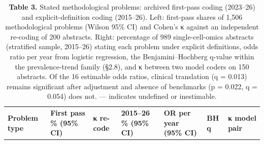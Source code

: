 \documentclass{article}
\begin{document}
\begin{longtable}[l]{@{}
  >{\raggedright\arraybackslash}p{}
  >{\raggedright\arraybackslash}p{}
  >{\raggedright\arraybackslash}p{}
  >{\raggedright\arraybackslash}p{}
  >{\raggedright\arraybackslash}p{}
  >{\raggedright\arraybackslash}p{}
  >{\raggedright\arraybackslash}p{}@{}}
\caption{\textbf{Table 3.} Stated methodological problems: archived first-pass
coding (2023--26) and explicit-definition coding (2015--26). Left:
first-pass shares of 1,506 methodological problems (Wilson 95\% CI) and
Cohen's κ against an independent re-coding of 200 abstracts. Right:
percentage of 989 single-cell-omics abstracts (stratified sample,
2015--26) stating each problem under explicit definitions, odds ratio
per year from logistic regression, the Benjamini--Hochberg q-value
within the prevalence-trend family (§2.8), and κ between two model
coders on 150 abstracts. Of the 16 estimable odds ratios, clinical
translation (q = 0.013) remains significant after adjustment and absence
of benchmarks (p = 0.022, q = 0.054) does not. --- indicates undefined
or inestimable.}\tabularnewline
\toprule
\begin{minipage}[b]{\linewidth}\raggedright
\textbf{Problem type}
\end{minipage} & \begin{minipage}[b]{\linewidth}\raggedright
\textbf{First pass \% (95\% CI)}
\end{minipage} & \begin{minipage}[b]{\linewidth}\raggedright
\textbf{κ re-code}
\end{minipage} & \begin{minipage}[b]{\linewidth}\raggedright
\textbf{2015--26 \% (95\% CI)}
\end{minipage} & \begin{minipage}[b]{\linewidth}\raggedright
\textbf{OR per year (95\% CI)}
\end{minipage} & \begin{minipage}[b]{\linewidth}\raggedright
\textbf{BH q}
\end{minipage} & \begin{minipage}[b]{\linewidth}\raggedright
\textbf{κ model pair}
\end{minipage} \\

\end{longtable}
\end{document}
